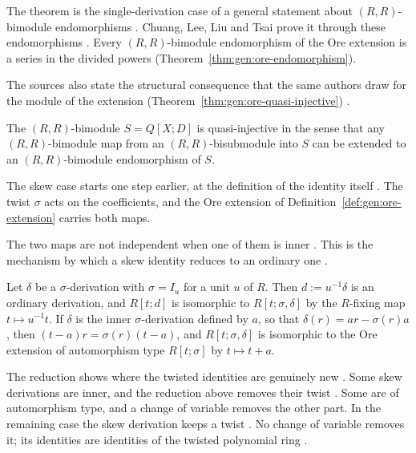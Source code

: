 The theorem is the single-derivation case of a general statement about
$(R,R)$-bimodule endomorphisms \cite[p.~164]{ChuangLee2010Higher}. Chuang, Lee,
Liu and Tsai prove it through these endomorphisms
\cite[Theorem~3, p.~165]{ChuangLee2010Higher}. Every
$(R,R)$-bimodule endomorphism of the Ore extension is a series in the divided
powers (Theorem~\ref{thm:gen:ore-endomorphism}).

The sources also state the structural consequence that the same authors draw
for the module of the extension (Theorem~\ref{thm:gen:ore-quasi-injective}) \cite[p.~169]{ChuangLee2010Higher}.

\begin{theorem}\label{thm:gen:ore-quasi-injective}
The $(R,R)$-bimodule $S=Q[X;D]$ is quasi-injective in the sense that any
$(R,R)$-bimodule map from an $(R,R)$-bisubmodule into $S$ can be extended to an
$(R,R)$-bimodule endomorphism of $S$.
\end{theorem}

The skew case starts one step earlier, at the definition of the identity
itself \cite[p.~2838]{Chuang2017Auto}. The twist $\sigma$ acts on the
coefficients, and the Ore extension of
Definition~\ref{def:gen:ore-extension} carries both maps.

The two maps are not independent when one of them is inner
\cite[p.~2841]{Chuang2017Auto}. This is the mechanism by which a skew identity
reduces to an ordinary one \cite[p.~2841]{Chuang2017Auto}.

\begin{remark}\label{rem:gen:skew-reduce}
Let $\delta$ be a $\sigma$-derivation with $\sigma=I_{u}$ for a unit $u$ of
$R$. Then $d:=u^{-1}\delta$ is an ordinary derivation, and $R[t;d]$ is
isomorphic to $R[t;\sigma,\delta]$ by the $R$-fixing map $t\mapsto u^{-1}t$. If
$\delta$ is the inner $\sigma$-derivation defined by $a$, so that
$\delta(r)=ar-\sigma(r)a$, then $(t-a)r=\sigma(r)(t-a)$, and
$R[t;\sigma,\delta]$ is isomorphic to the Ore extension of automorphism type
$R[t;\sigma]$ by $t\mapsto t+a$.
\end{remark}

The reduction shows where the twisted identities are genuinely new
\cite[p.~2838]{Chuang2017Auto}. Some skew derivations are inner, and the
reduction above removes their twist
\cite[p.~2841]{Chuang2017Auto}. Some are of automorphism type, and a
change of variable removes the other part. In the remaining case the skew
derivation keeps a twist \cite[p.~2841]{Chuang2017Auto}. No change of
variable removes it; its identities are identities of the twisted polynomial
ring \cite[p.~2841]{Chuang2017Auto}.

